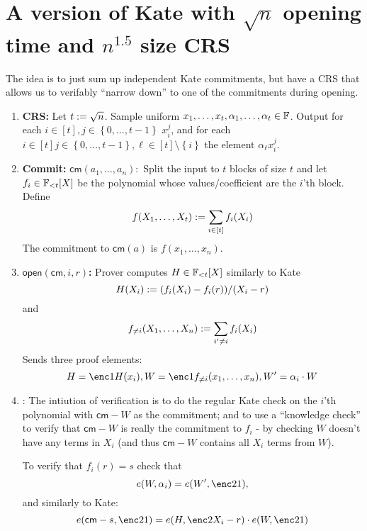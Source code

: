 \documentclass[11pt]{article}
\numberwithin{figure}{section} %
\newcommand{\cm}{\ensuremath{\mathsf{cm}}\xspace}
\newcommand{\open}{\ensuremath{\mathsf{open}}\xspace}
\newcommand{\set}[1]{\ensuremath{\left\{#1\right\}}\xspace}
\begin{document}
 \section{A version of Kate with $\sqrt{n}$ opening time and $n^{1.5}$ size CRS}
 The idea is to just sum up independent Kate commitments, but have a CRS that allows us to verifably ``narrow down'' to one of the commitments during opening.
 \begin{enumerate}
  \item \textbf{CRS:} Let $t:= \sqrt n$. Sample uniform $x_1,\ldots,x_t,\alpha_1,\ldots,\alpha_t\in {\mathbb F}$. Output for each  $i\in [t], j\in \set{0,\ldots, t-1}$ $x_i^j$, and for each $i\in [t]  j\in \set{0,\ldots, t-1},\ell \in [t]\setminus\set{i}$ the element $\alpha_\ell x_i^j$.
  \item \textbf{Commit:} $\cm(a_1,\ldots,a_n):$ Split the input to $t$ blocks of size $t$ and let $f_i\in{\mathbb F}_{< t}[X]$ be the polynomial whose values/coefficient are the $i$'th block.
  Define
  \[f(X_1,\ldots,X_t):= \sum_{i\in [t]} f_i(X_i)  \]
  The commitment  to $\cm(a)$ is $f(x_1,\ldots,x_n)$.
  \item \textbf{$\open(\cm,i,r)$:}  Prover computes $H\in {\mathbb F}_{< t}[X]$ similarly to Kate
  \[H(X_i):= (f_i(X_i)-f_i(r))/(X_i-r)\]
  and 
  \[f_{\neq i}(X_1,\ldots,X_n):=\sum_{i'\neq i} f_i(X_i)\]
  Sends three proof elements:
  \[H=\enc1{H(x_i)},W=\enc1{f_{\neq i}(x_1,\ldots,x_n)}, W'=\alpha_i\cdot W\] 
  \item \verify{\cm,H,W,W',i,r,s}: The intiution of verification is to do the regular Kate check on the $i$'th polynomial with $\cm-W$ as the commitment; and to use a ``knowledge check'' to verify that $\cm-W$ is really the commitment to $f_i$ - by checking $W$ doesn't have any terms in $X_i$ (and thus $\cm-W$ contains all $X_i$ terms from $W$).
  
  To verify that $f_i(r)=s$  check that
  \[e(W,\alpha_i)= e(W',\enc2{1}),  \]
  and similarly to Kate:
  \[e(\cm - s,\enc2{1})=e(H,\enc2{X_i-r})\cdot e(W,\enc2{1})\]
  \end{enumerate}

 
 

\end{document}
